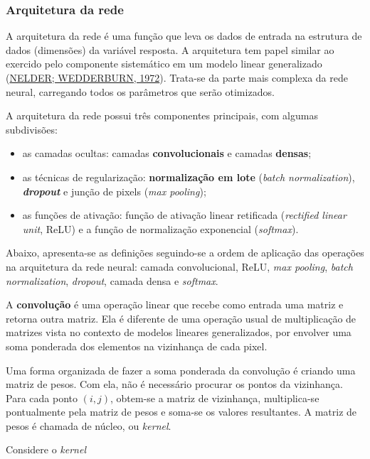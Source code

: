 \documentclass[12pt,twoside,brazilian]{book}
\providecommand{\tightlist}{%
  \setlength{\itemsep}{0pt}\setlength{\parskip}{0pt}}
\begin{document}
\hypertarget{sec-arquitetura-rede}{%
\subsubsection{Arquitetura da rede}\label{sec-arquitetura-rede}}

A arquitetura da rede é uma função que leva os dados de entrada na
estrutura de dados (dimensões) da variável resposta. A arquitetura tem
papel similar ao exercido pelo componente sistemático em um modelo
linear generalizado (\protect\hyperlink{ref-nelder1972}{NELDER;
WEDDERBURN, 1972}). Trata-se da parte mais complexa da rede neural,
carregando todos os parâmetros que serão otimizados.

A arquitetura da rede possui três componentes principais, com algumas
subdivisões:

\begin{itemize}
\tightlist
\item
  as camadas ocultas: camadas \textbf{convolucionais} e camadas
  \textbf{densas};
\item
  as técnicas de regularização: \textbf{normalização em lote}
  (\emph{batch normalization}), \textbf{\emph{dropout}} e junção de
  pixels (\emph{max pooling});
\item
  as funções de ativação: função de ativação linear retificada
  (\emph{rectified linear unit}, ReLU) e a função de normalização
  exponencial (\emph{softmax}).
\end{itemize}

Abaixo, apresenta-se as definições seguindo-se a ordem de aplicação das
operações na arquitetura da rede neural: camada convolucional, ReLU,
\emph{max pooling}, \emph{batch normalization}, \emph{dropout}, camada
densa e \emph{softmax}.

A \textbf{convolução} é uma operação linear que recebe como entrada uma
matriz e retorna outra matriz. Ela é diferente de uma operação usual de
multiplicação de matrizes vista no contexto de modelos lineares
generalizados, por envolver uma soma ponderada dos elementos na
vizinhança de cada pixel.

Uma forma organizada de fazer a soma ponderada da convolução é criando
uma matriz de pesos. Com ela, não é necessário procurar os pontos da
vizinhança. Para cada ponto \((i,j)\), obtem-se a matriz de vizinhança,
multiplica-se pontualmente pela matriz de pesos e soma-se os valores
resultantes. A matriz de pesos é chamada de núcleo, ou \emph{kernel}.

Considere o \emph{kernel}
\end{document}
